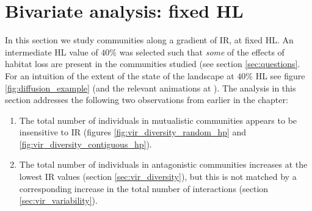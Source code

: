 \section{Bivariate analysis: fixed HL}
\label{sec:biv_fixHL}

In this section we study communities along a gradient of IR, at fixed HL. An intermediate HL value of $40\%$ was selected such that \emph{some} of the effects of habitat loss are present in the communities studied (see section \ref{sec:questions}. For an intuition of the extent of the state of the landscape at $40\%$ HL see figure \ref{fig:diffusion_example} (and the relevant animations at \cite{mcwilliams2015anim}). The analysis in this section addresses the following two observations from earlier in the chapter:
\begin{enumerate}
	\item The total number of individuals in mutualistic communities appears to be insensitive to IR (figures \ref{fig:vir_diversity_random_hp} and \ref{fig:vir_diversity_contiguous_hp}).
	\item The total number of individuals in antagonistic communities increases at the lowest IR values (section \ref{sec:vir_diversity}), but this is not matched by a corresponding increase in the total number of interactions (section \ref{sec:vir_variability}).
\end{enumerate}

%
%

